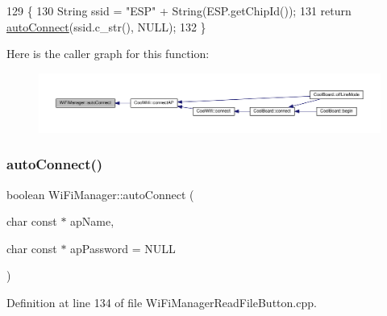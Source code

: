 \begin{DoxyCode}
129                                  \{
130   String ssid = \textcolor{stringliteral}{"ESP"} + String(ESP.getChipId());
131   \textcolor{keywordflow}{return} \hyperlink{class_wi_fi_manager_ae3cdfa6b02edcfe63d7da4f696b62136}{autoConnect}(ssid.c\_str(), NULL);
132 \}
\end{DoxyCode}
Here is the caller graph for this function\+:\nopagebreak
\begin{figure}[H]
\begin{center}
\leavevmode
\includegraphics[width=350pt]{d4/dc8/class_wi_fi_manager_ae3cdfa6b02edcfe63d7da4f696b62136_icgraph}
\end{center}
\end{figure}
\mbox{\label{class_wi_fi_manager_ab1d094034e5e3e36e2e1b3624edad469}} 
\subsubsection{\texorpdfstring{auto\+Connect()}{autoConnect()}\hspace{0.1cm}{\footnotesize\ttfamily [2/2]}}
{\footnotesize\ttfamily boolean Wi\+Fi\+Manager\+::auto\+Connect (\begin{DoxyParamCaption}\item[{char const $\ast$}]{ap\+Name,  }\item[{char const $\ast$}]{ap\+Password = {\ttfamily NULL} }\end{DoxyParamCaption})}



Definition at line 134 of file Wi\+Fi\+Manager\+Read\+File\+Button.\+cpp.


